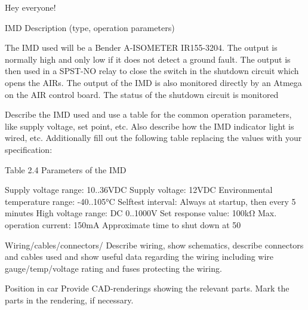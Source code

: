 \documentclass{article}
\begin{document}
Hey everyone!

IMD
Description (type, operation parameters)


The IMD used will be a Bender A-ISOMETER IR155-3204. The output is normally high and only low if it does not detect a ground fault. The output is then used in a SPST-NO relay to close the switch in the shutdown circuit which opens the AIRs. The output of the IMD is also monitored directly by an Atmega on the AIR control board. The status of the shutdown circuit is monitored


Describe the IMD used and use a table for the common operation parameters, like supply voltage, set point, etc. Also describe how the IMD indicator light is wired, etc.
Additionally fill out the following table replacing the values with your specification:


Table 2.4 Parameters of the IMD

Supply voltage range:  10..36VDC
Supply voltage:  12VDC
Environmental temperature range:  -40..105°C
Selftest interval:  Always at startup, then every 5 minutes
High voltage range:  DC 0..1000V
Set response value:  100kΩ
Max. operation current:  150mA
Approximate time to shut down at 50%


Wiring/cables/connectors/
Describe wiring, show schematics, describe connectors and cables used and show useful data regarding the wiring including wire gauge/temp/voltage rating and fuses protecting the wiring.


Position in car
Provide CAD-renderings showing the relevant parts. Mark the parts in the rendering, if necessary.
\end{document}
